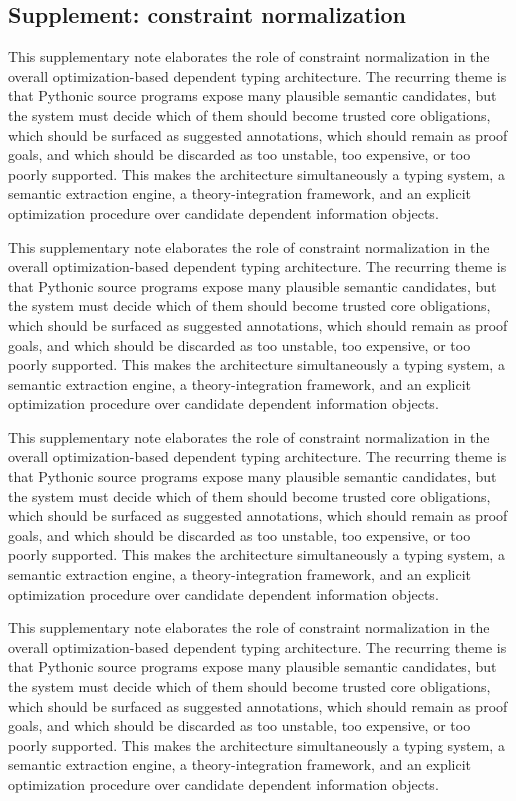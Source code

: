 \documentclass[11pt]{article}
\theoremstyle{definition}
\theoremstyle{plain}
\begin{document}
\subsection{Supplement: constraint normalization}
This supplementary note elaborates the role of constraint normalization in the overall
optimization-based dependent typing architecture. The recurring theme is that
Pythonic source programs expose many plausible semantic candidates, but the
system must decide which of them should become trusted core obligations, which
should be surfaced as suggested annotations, which should remain as proof
goals, and which should be discarded as too unstable, too expensive, or too
poorly supported. This makes the architecture simultaneously a typing system,
a semantic extraction engine, a theory-integration framework, and an explicit
optimization procedure over candidate dependent information objects.

This supplementary note elaborates the role of constraint normalization in the overall
optimization-based dependent typing architecture. The recurring theme is that
Pythonic source programs expose many plausible semantic candidates, but the
system must decide which of them should become trusted core obligations, which
should be surfaced as suggested annotations, which should remain as proof
goals, and which should be discarded as too unstable, too expensive, or too
poorly supported. This makes the architecture simultaneously a typing system,
a semantic extraction engine, a theory-integration framework, and an explicit
optimization procedure over candidate dependent information objects.

This supplementary note elaborates the role of constraint normalization in the overall
optimization-based dependent typing architecture. The recurring theme is that
Pythonic source programs expose many plausible semantic candidates, but the
system must decide which of them should become trusted core obligations, which
should be surfaced as suggested annotations, which should remain as proof
goals, and which should be discarded as too unstable, too expensive, or too
poorly supported. This makes the architecture simultaneously a typing system,
a semantic extraction engine, a theory-integration framework, and an explicit
optimization procedure over candidate dependent information objects.

This supplementary note elaborates the role of constraint normalization in the overall
optimization-based dependent typing architecture. The recurring theme is that
Pythonic source programs expose many plausible semantic candidates, but the
system must decide which of them should become trusted core obligations, which
should be surfaced as suggested annotations, which should remain as proof
goals, and which should be discarded as too unstable, too expensive, or too
poorly supported. This makes the architecture simultaneously a typing system,
a semantic extraction engine, a theory-integration framework, and an explicit
optimization procedure over candidate dependent information objects.
\end{document}
